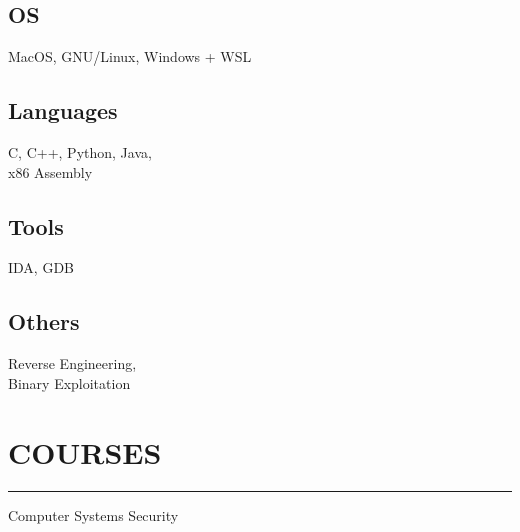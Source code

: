 \begin{minipage}[t]{0.33\textwidth}
    \subsection{OS}
    \noindent MacOS, GNU/Linux, Windows + WSL

    \vspace{6pt}
    \subsection{Languages}
    \noindent C, C++, Python, Java,\\
    x86 Assembly

    \vspace{6pt}
    \subsection{Tools}
    \noindent IDA, GDB

    \vspace{6pt}
    \subsection{Others}
    \noindent Reverse Engineering,\\
    Binary Exploitation


    \section{COURSES}
    \noindent\rule{5cm}{0.4pt}

    \noindent Computer Systems Security\\
    \noindent {}\\

\end{minipage}

%
%

